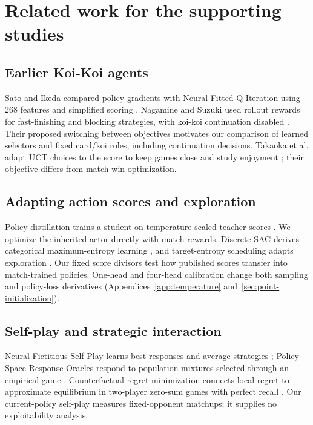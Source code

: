 \section{Related work for the supporting studies}
\label{app:supporting-related}
\subsection{Earlier Koi-Koi agents}
Sato and Ikeda compared policy gradients with Neural Fitted Q Iteration using
268 features and simplified scoring \cite{sato2017koikoi}. Nagamine and Suzuki
used rollout rewards for fast-finishing and blocking strategies, with koi-koi
continuation disabled \cite{nagamine2021strategy}. Their proposed switching
between objectives motivates our comparison of learned selectors and fixed
card/koi roles, including continuation decisions. Takaoka et al. adapt UCT
choices to the score to keep games close and study enjoyment
\cite{takaoka2018fun}; their objective differs from match-win optimization.

\subsection{Adapting action scores and exploration}
Policy distillation trains a student on temperature-scaled teacher scores
\cite{rusu2016distillation}. We optimize the inherited actor directly with
match rewards. Discrete SAC derives categorical maximum-entropy learning
\cite{christodoulou2019discrete}, and target-entropy scheduling adapts exploration
\cite{xu2021entropy}. Our fixed score divisors test how published scores transfer
into match-trained policies. One-head and four-head calibration change both
sampling and policy-loss derivatives (Appendices~\ref{app:temperature}
and~\ref{sec:point-initialization}).

\subsection{Self-play and strategic interaction}
Neural Fictitious Self-Play learns best responses and average strategies
\cite{heinrich2016nfsp}; Policy-Space Response Oracles respond to population
mixtures selected through an empirical game \cite{lanctot2017psro}.
Counterfactual regret minimization connects local regret to approximate
equilibrium in two-player zero-sum games with perfect recall
\cite{zinkevich2007cfr}. Our current-policy self-play measures fixed-opponent
matchups; it supplies no exploitability analysis.

